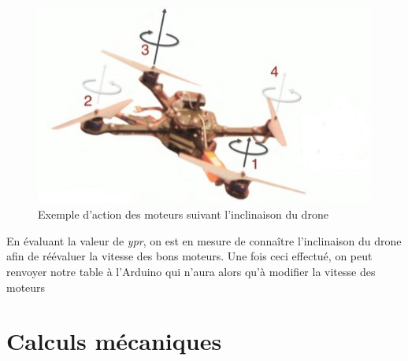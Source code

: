 \documentclass[a4paper,10pt]{report}
\begin{document}
	  \begin{figure}[htbp]
	    \centering
	    \includegraphics[scale = 0.5]{img/quadcopter.jpg}
	    \caption{Exemple d'action des moteurs suivant l'inclinaison du 
drone}
	    \label{inclinaisondrone}
	  \end{figure}

	  En évaluant la valeur de \textit{ypr}, on est en mesure de connaître 
l'inclinaison du drone afin de réévaluer la vitesse des bons moteurs. Une fois 
ceci effectué, on peut renvoyer notre table à l'Arduino qui n'aura alors qu'à 
modifier la vitesse des moteurs
    
    \chapter{Calculs mécaniques}

  \listoffigures
  
  \raggedright
  
  
\end{document}
